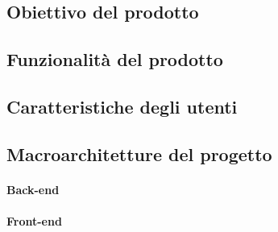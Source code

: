 \documentclass[../analisi-dei-requisiti]{subfiles}
\begin{document}
\subsection{Obiettivo del prodotto}
\label{sub:obiettivo_del_prodotto}

\subsection{Funzionalità del prodotto}
\label{sub:funzionalita_del_prodotto}

\subsection{Caratteristiche degli utenti}
\label{sub:caratteristiche_degli_utenti}

\subsection{Macroarchitetture del progetto}
\label{sub:macroarchitetture_del_progetto}
\paragraph{Back-end}
\label{par:back-end}

\paragraph{Front-end}
\label{par:front-end}

\end{document}
